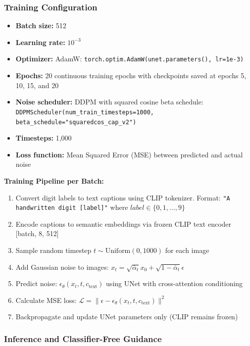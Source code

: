 \subsubsection{Training Configuration}

\begin{itemize}
    \item \textbf{Batch size:} 512
    \item \textbf{Learning rate:} $10^{-3}$
    \item \textbf{Optimizer:} AdamW: \texttt{torch.optim.AdamW(unet.parameters(), lr=1e-3)}
    \item \textbf{Epochs:} 20 continuous training epochs with checkpoints saved at epochs 5, 10, 15, and 20
    \item \textbf{Noise scheduler:} DDPM with squared cosine beta schedule: \texttt{DDPMScheduler(num\_train\_timesteps=1000, beta\_schedule="squaredcos\_cap\_v2")}
    \item \textbf{Timesteps:} 1,000
    \item \textbf{Loss function:} Mean Squared Error (MSE) between predicted and actual noise
\end{itemize}

\textbf{Training Pipeline per Batch:}
\begin{enumerate}
    \item Convert digit labels to text captions using CLIP tokenizer. Format: \texttt{"A handwritten digit [label]"} where $label \in \{0, 1, ..., 9\}$
    \item Encode captions to semantic embeddings via frozen CLIP text encoder [batch, 8, 512]
    \item Sample random timestep $t \sim \text{Uniform}(0, 1000)$ for each image
    \item Add Gaussian noise to images: $x_t = \sqrt{\bar{\alpha}_t} x_0 + \sqrt{1-\bar{\alpha}_t} \epsilon$
    \item Predict noise: $\epsilon_\theta(x_t, t, c_\text{text})$ using UNet with cross-attention conditioning
    \item Calculate MSE loss: $\mathcal{L} = \|\epsilon - \epsilon_\theta(x_t, t, c_\text{text})\|^2$
    \item Backpropagate and update UNet parameters only (CLIP remains frozen)
\end{enumerate}

\subsubsection{Inference and Classifier-Free Guidance}


